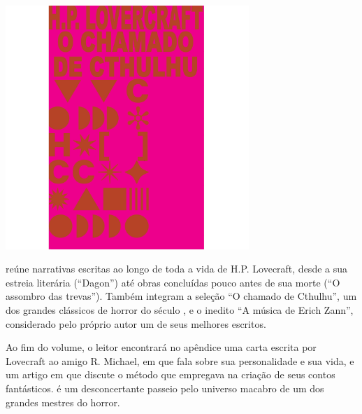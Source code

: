\pagebreak

\hspace{.5cm}

\begin{center}
\hspace*{-2.5cm}
\hspace*{2.5cm}\includegraphics[width=92mm]{./grid/lovecraft.jpg}
\end{center}

\hspace*{-7cm}\hrulefill\hspace*{-7cm}

\medskip

 reúne narrativas escritas ao longo de toda a vida de H.P. Lovecraft, desde a sua estreia literária (“Dagon”) até obras concluídas pouco antes de sua morte (“O assombro das trevas”). Também integram a seleção
“O chamado de Cthulhu”, um dos grandes clássicos de horror do século , e o inedito “A música de Erich Zann”, considerado pelo próprio autor um de seus melhores escritos.

Ao fim do volume, o leitor encontrará no apêndice uma carta escrita por
Lovecraft ao amigo R. Michael, em que fala sobre sua personalidade e sua vida, e um artigo em que discute o método que empregava na criação de seus contos fantásticos. {} é um desconcertante passeio pelo universo macabro de um dos grandes mestres do horror.

\vfill

\hspace*{-.4cm}\begin{minipage}[c]{.5\linewidth}
\small{
{}}
\end{minipage}

